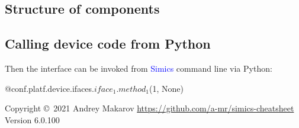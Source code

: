 \documentclass[8pt]{extarticle}
\newenvironment{code}[1][]{%
\begin{prebox}[#1]\obeylines}{%
\end{prebox}}
\newcommand{\Simics}{\textcolor{blue}{Simics}}
\begin{document}
\begin{multicols*}{3}
\subsection{Structure of components}

\subsection{Calling device code from Python}

Then the interface can be invoked from \Simics{} command line via Python:
\begin{code}
    @conf.platf.device.ifaces.$iface_1$.$method_1$(1, None)
\end{code}

Copyright \copyright\ 2021 Andrey Makarov
\href{https://github.com/a-mr/simics-cheatsheet}{https://github.com/a-mr/simics-cheatsheet}
Version 6.0.100

\end{multicols*}
\end{document}
